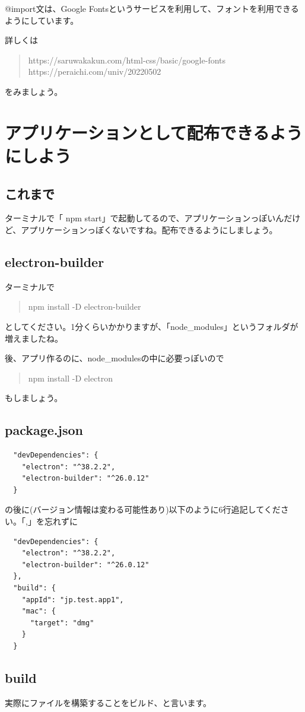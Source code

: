 \documentclass[mingoth,11pt,a4j,uplatex]{jsarticle}
\begin{document}
@import文は、Google Fontsというサービスを利用して、フォントを利用できるようにしています。

詳しくは
\begin{quote}
https://saruwakakun.com/html-css/basic/google-fonts
https://peraichi.com/univ/20220502
\end{quote}
をみましょう。

\section{アプリケーションとして配布できるようにしよう}
\subsection{これまで}
ターミナルで「 npm start」で起動してるので、アプリケーションっぽいんだけど、アプリケーションっぽくないですね。配布できるようにしましょう。

\subsection{electron-builder}
ターミナルで
\begin{quote}
npm install -D electron-builder
\end{quote}
としてください。1分くらいかかりますが、「node\_modules」というフォルダが増えましたね。

後、アプリ作るのに、node\_modulesの中に必要っぽいので
\begin{quote}
npm install -D electron
\end{quote}
もしましょう。

\subsection{package.json}
\begin{verbatim}
  "devDependencies": {
    "electron": "^38.2.2",
    "electron-builder": "^26.0.12"
  }
\end{verbatim}
の後に(バージョン情報は変わる可能性あり)以下のように6行追記してください。「,」を忘れずに
\begin{verbatim}
  "devDependencies": {
    "electron": "^38.2.2",
    "electron-builder": "^26.0.12"
  },
  "build": {
    "appId": "jp.test.app1",
    "mac": {
      "target": "dmg"
    }
  }
\end{verbatim}

\subsection{build}
実際にファイルを構築することをビルド、と言います。
\end{document}
